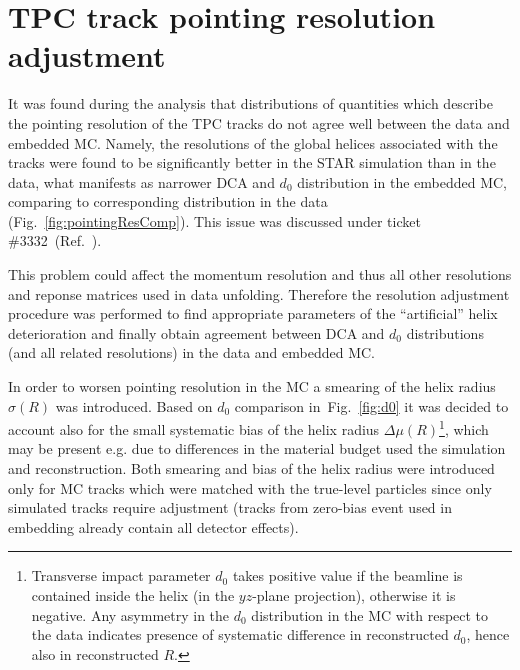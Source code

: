 

\chapter{TPC track pointing resolution adjustment}\label{chap:tpcTrackPointingRes}

It was found during the analysis that distributions of quantities which describe the pointing resolution of the TPC tracks do not agree well between the data and embedded MC. Namely, the resolutions of the global helices associated with the tracks were found to be significantly better in the STAR simulation than in the data, what manifests as narrower DCA and $d_{0}$ distribution in the embedded MC, comparing to corresponding distribution in the data (Fig.~\ref{fig:pointingResComp}). This issue was discussed under ticket \#3332~(Ref.~\cite{dcaTicket}).

This problem could affect the momentum resolution and thus all other resolutions and reponse matrices used in data unfolding. Therefore the resolution adjustment procedure was performed to find appropriate parameters of the ``artificial'' helix deterioration and finally obtain agreement between DCA and $d_{0}$ distributions (and all related resolutions) in the data and embedded MC.

In order to worsen pointing resolution in the MC a smearing of the helix radius $\sigma(R)$ was introduced. Based on $d_{0}$ comparison in~Fig.~\ref{fig:d0} it was decided to account also for the small systematic bias of the helix radius $\Delta\mu(R)$\footnote{Transverse impact parameter $d_{0}$ takes positive value if the beamline is contained inside the helix (in the $yz$-plane projection), otherwise it is negative. Any asymmetry in the $d_{0}$ distribution in the MC with respect to the data indicates presence of systematic difference in reconstructed $d_{0}$, hence also in reconstructed $R$.}, which may be present e.g. due to differences in the material budget used the simulation and reconstruction. Both smearing and bias of the helix radius were introduced only for MC tracks which were matched with the true-level particles since only simulated tracks require adjustment (tracks from zero-bias event used in embedding already contain all detector effects).

